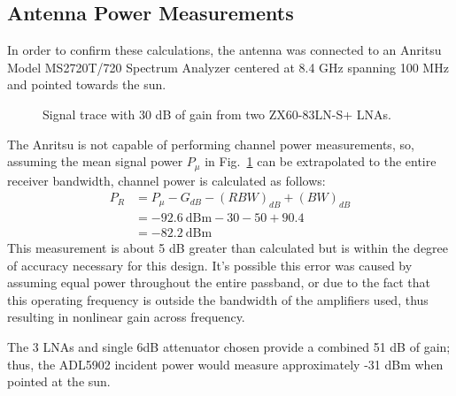 \documentclass[titlepage]{article}
\begin{document}
\subsection{Antenna Power Measurements}
In order to confirm these calculations, the antenna was connected to an Anritsu Model MS2720T/720 Spectrum Analyzer centered at 8.4 GHz spanning 100 MHz and pointed towards the sun.
\begin{figure}[H]
\begin {center}
\caption{Signal trace with 30 dB of gain from two ZX60-83LN-S+ LNAs.}\label{fig:specan1}
\end {center}
\end{figure}
The Anritsu is not capable of performing channel power measurements, so, assuming the mean signal power $P_{\mu}$ in Fig.~\ref{fig:specan1} can be extrapolated to the entire receiver bandwidth, channel power is calculated as follows:
\begin{align*}
    P_R &= P_{\mu} - G_{dB} - \left(RBW\right)_{dB} + \left(BW\right)_{dB}\\
        &= -92.6\ \text{dBm} - 30 - 50 + 90.4\\
        &= -82.2\ \text{dBm}
\end{align*}
This measurement is about 5 dB greater than calculated but is within the degree of accuracy necessary for this design. It's possible this error was caused by assuming equal power throughout the entire passband, or due to the fact that this operating frequency is outside the bandwidth of the amplifiers used, thus resulting in nonlinear gain across frequency.

The 3 LNAs and single 6dB attenuator chosen provide a combined 51 dB of gain; thus, the ADL5902 incident power would measure approximately -31 dBm when pointed at the sun.
\end{document}
